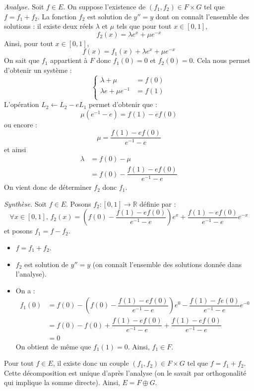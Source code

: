 \documentclass[a4paper,twoside,french,11pt]{VcCours}
\begin{document}
  
 \noindent \textit{Analyse.} Soit $f \in E$. On suppose l'existence de $(f_1,f_2) \in F \times G$ tel que $f=f_1+f_2$. La fonction $f_2$ est solution de $y''=y$ dont on connaît l'ensemble des solutions : il existe deux réels $\lambda$ et $\mu$ tels que pour tout $x \in [0,1]$,
 $$ f_2(x) = \lambda e^x + \mu e^{-x}$$
 Ainsi, pour tout $x \in [0,1]$,
 $$ f(x)= f_1(x) + \lambda e^x + \mu e^{-x}$$
 On sait que $f_1$ appartient à $F$ donc $f_1(0)=0$ et $f_2(0) =0$. Cela nous permet d'obtenir un système :
 $$ \left\lbrace \begin{array}{rl}
 \lambda + \mu & = f(0) \\
 \lambda e+ \mu e^{-1} & = f(1) \\
 \end{array}\right.$$
 L'opération $L_2 \leftarrow L_2- e L_1$ permet d'obtenir que :
 $$ \mu (e^{-1}-e) = f(1)-e f(0)$$
 ou encore :
 $$ \mu = \dfrac{f(1)-e f(0)}{e^{-1}-e}$$
 et ainsi
 \begin{align*}
 \lambda & = f(0)- \mu \\
 & = f(0) - \dfrac{f(1)-ef(0)}{e^{-1}-e} 
 \end{align*}
 On vient donc de déterminer $f_2$ donc $f_1$.
  
 \noindent \textit{Synthèse.} Soit $f \in E$. Posons $f_2 : [0,1] \rightarrow \mathbb{R}$ définie par :
 $$ \forall x \in [0,1], \, f_2(x)= \left(f(0) - \dfrac{f(1)-ef(0)}{e^{-1}-e} \right) e^x + \dfrac{f(1)-ef(0)}{e^{-1}-e} e^{-x}$$
 et posons $f_1 = f-f_2$. 
 \begin{itemize}
 \item $f=f_1+f_2$.
 \item $f_2$ est solution de $y''=y$ (on connaît l'ensemble des solutions donnée dans l'analyse).
 \item On a :
 \begin{align*}
 f_1(0) & = f(0) - \left(f(0) - \dfrac{f(1)-ef(0)}{e^{-1}-e} \right) e^0 - \dfrac{f(1)-fe(0)}{e^{-1}-e} e^{-0} \\
 & = f(0) -f(0) + \dfrac{f(1)-ef(0)}{e^{-1}-e} + \dfrac{f(1)-ef(0)}{e^{-1}-e} \\
 & = 0 
 \end{align*}
 On obtient de même que $f_1(1)=0$. Ainsi, $f_1 \in F$.
 \end{itemize}
 Pour tout $f \in E$, il existe donc un couple $(f_1,f_2) \in F \times G$ tel que $f=f_1+f_2$. Cette décomposition est unique d'après l'analyse (on le savait par orthogonalité qui implique la somme directe). Ainsi, $E= F \oplus G$.
 
\end{document}
